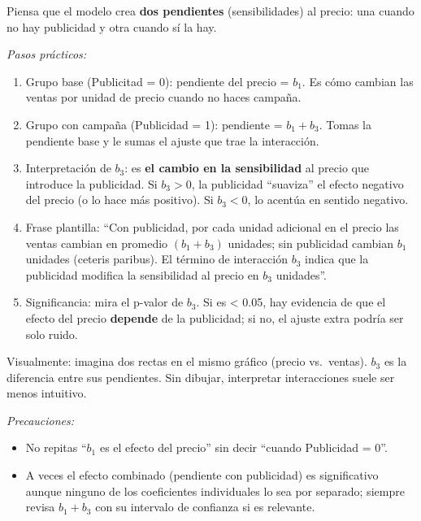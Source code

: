 \documentclass[
  spanish,
  letterpaper,
  DIV=11,
  numbers=noendperiod]{scrreprt}
\providecommand{\tightlist}{%
  \setlength{\itemsep}{0pt}\setlength{\parskip}{0pt}}
\begin{document}
\begin{tcolorbox}[enhanced jigsaw, toptitle=1mm, opacitybacktitle=0.6, leftrule=.75mm, arc=.35mm, title=\textcolor{quarto-callout-note-color}{\faInfo}\hspace{0.5em}{Cómo analizar (intuitivamente) el término de interacción}, colback=white, bottomrule=.15mm, colbacktitle=quarto-callout-note-color!10!white, opacityback=0, bottomtitle=1mm, breakable, rightrule=.15mm, coltitle=black, left=2mm, titlerule=0mm, colframe=quarto-callout-note-color-frame, toprule=.15mm]

Piensa que el modelo crea \textbf{dos pendientes} (sensibilidades) al
precio: una cuando no hay publicidad y otra cuando sí la hay.

\emph{Pasos prácticos:}

\begin{enumerate}
\def\labelenumi{\arabic{enumi}.}
\tightlist
\item
  Grupo base (Publicitad = 0): pendiente del precio = \(b_1\). Es cómo
  cambian las ventas por unidad de precio cuando no haces campaña.
\item
  Grupo con campaña (Publicidad = 1): pendiente = \(b_1 + b_3\). Tomas
  la pendiente base y le sumas el ajuste que trae la interacción.
\item
  Interpretación de \(b_3\): es \textbf{el cambio en la sensibilidad} al
  precio que introduce la publicidad. Si \(b_3 > 0\), la publicidad
  ``suaviza'' el efecto negativo del precio (o lo hace más positivo). Si
  \(b_3 < 0\), lo acentúa en sentido negativo.
\item
  Frase plantilla: ``Con publicidad, por cada unidad adicional en el
  precio las ventas cambian en promedio \((b_1 + b_3)\) unidades; sin
  publicidad cambian \(b_1\) unidades (ceteris paribus). El término de
  interacción \(b_3\) indica que la publicidad modifica la sensibilidad
  al precio en \(b_3\) unidades''.
\item
  Significancia: mira el p-valor de \(b_3\). Si es \textless{} 0.05, hay
  evidencia de que el efecto del precio \textbf{depende} de la
  publicidad; si no, el ajuste extra podría ser solo ruido.
\end{enumerate}

Visualmente: imagina dos rectas en el mismo gráfico (precio vs.~ventas).
\(b_3\) es la diferencia entre sus pendientes. Sin dibujar, interpretar
interacciones suele ser menos intuitivo.

\emph{Precauciones:}

\begin{itemize}
\tightlist
\item
  No repitas ``\(b_1\) es el efecto del precio'' sin decir ``cuando
  Publicidad = 0''.
\item
  A veces el efecto combinado (pendiente con publicidad) es
  significativo aunque ninguno de los coeficientes individuales lo sea
  por separado; siempre revisa \(b_1 + b_3\) con su intervalo de
  confianza si es relevante.
\end{itemize}

\end{tcolorbox}
\end{document}

